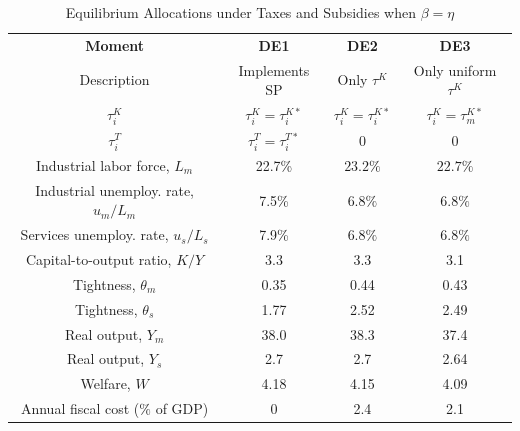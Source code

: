 \documentclass[12pt]{article} %
\theoremstyle{definition}
\begin{document}
\begin{table}[H]
 \caption{Equilibrium Allocations under Taxes and Subsidies when $\beta=\eta$} \label{policytable}
\centering
 \begin{tabular}{||c c c c||} 
 \hline
 \textbf{Moment} & \textbf{DE1}  & \textbf{DE2 }  & \textbf{DE3}\\  
 Description    & Implements SP & Only $\tau^K$  & Only uniform $\tau^K$ \\
  $\tau^K_i$  &   $\tau^K_i=\tau^{K*}_i$     &  $\tau^K_i=\tau^{K*}_i$    &  $\tau^K_i = \tau^{K*}_m$  \\
    $\tau^T_i$  &   $\tau^T_i=\tau^{T*}_i$     &  0    &   0  \\
 \hline\hline
  Industrial labor force, $L_m$   & 22.7\%& $23.2\%$&   $22.7\%$ \\
  Industrial unemploy. rate, $u_m/L_m$ & 7.5\%& $6.8\%$&  $6.8\%$  \\ 
   Services unemploy. rate, $u_s/L_s$  & 7.9\%&   $6.8\%$&   $6.8\%$  \\ 
  Capital-to-output ratio, $K/Y$  & 3.3& 3.3  &  3.1\\
  Tightness, $\theta_m$  & 0.35&  0.44&  0.43  \\
    Tightness, $\theta_s$  & 1.77&  2.52&  2.49 \\
 Real output, $Y_m$    & 38.0   & 38.3  & 37.4\\
 Real output, $Y_s$ &   2.7  &  2.7 &  2.64 \\
 Welfare, $W$  &     4.18    &  4.15      &  4.09           \\
 Annual fiscal cost ($\%$ of GDP)  &   0   &  2.4  & 2.1 \\
 \hline
 \end{tabular}
 
\end{table} 
\end{document}
